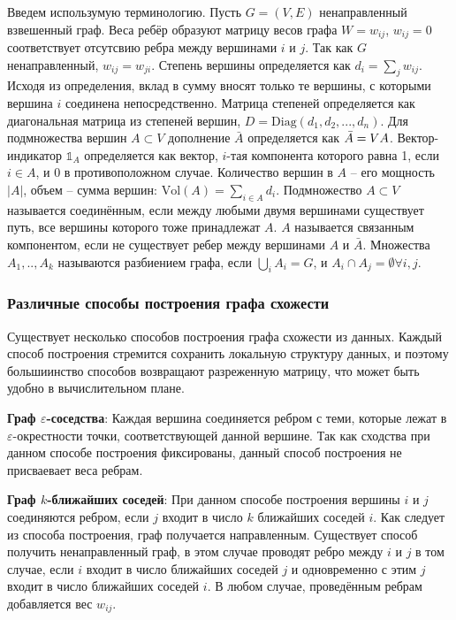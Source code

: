 Введем использумую терминологию. Пусть $G=(V,E)$ ненаправленный взвешенный граф. Веса ребёр образуют матрицу весов графа $W = w_{ij}$, $w_{ij}=0$ соответствует отсутсвию ребра между вершинами $i$ и $j$. Так как $G$ ненаправленный, $w_{ij} = w_{ji}$. Степень вершины определяется как $d_i = \sum_j w_{ij}$. Исходя из определения, вклад в сумму вносят только те вершины, с которыми вершина $i$ соединена непосредственно. Матрица степеней определяется как диагональная матрица из степеней вершин, $D=\text{Diag}(d_1,d_2,...,d_n)$. Для подмножества вершин $A \subset V$ дополнение $\bar{A}$ определяется как $\bar{A} = V \\ A$. Вектор-индикатор $\mathbb{1}_A$ определяется как вектор, $i$-тая компонента которого равна 1, если $i \in A$, и 0 в противоположном случае. Количество вершин в $A$ -- его мощность $|A|$, объем -- сумма вершин: $\text{Vol}(A) = \sum_{i \in A} d_i$. Подмножество $A \subset V$ называется соединённым, если между любыми двумя вершинами существует путь, все вершины которого тоже принадлежат $A$. $A$ называется связанным компонентом, если не существует ребер между вершинами $A$ и $\bar{A}$. Множества $A_1,..,A_k$ называются разбиением графа, если $\bigcup_i A_i = G$, и $A_i \cap A_j = \emptyset \forall i,j$.

\subsubsection{Различные способы построения графа схожести}
Существует несколько способов построения графа схожести из данных. Каждый способ построения стремится сохранить локальную структуру данных, и поэтому большиинство способов возвращают разреженную матрицу, что может быть удобно в вычислительном плане.

\textbf{Граф $\varepsilon$-соседства}: Каждая вершина соединяется ребром с теми, которые лежат в $\varepsilon$-окрестности точки, соответствующей данной вершине. Так как сходства при данном способе построения фиксированы, данный способ построения не присваевает веса ребрам.

\textbf{Граф $k$-ближайших соседей}: При данном способе построения вершины $i$ и $j$ соединяются ребром, если $j$ входит в число $k$ ближайших соседей $i$. Как следует из способа построения, граф получается направленным. Существует способ получить ненаправленный граф, в этом случае проводят ребро между $i$ и $j$ в том случае, если $i$ входит в число ближайших соседей $j$ и одновременно с этим $j$ входит в число ближайших соседей $i$. В любом случае, проведённым ребрам добавляется вес $w_{ij}$.


